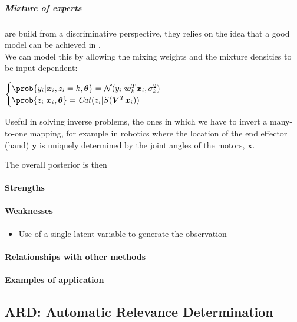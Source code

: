 \subparagraph{Mixture of experts}
are build from a discriminative perspective, they relies on the idea that a good
model can be achieved in .\\
We can model this by allowing the mixing weights and the mixture densities to be
input-dependent: 
\begin{center}
    $\begin{cases}
        \prob{y_{i}|\bm{x}_{i},z_{i}=k,\bm{\theta}} = \mathcal{N}(y_{i}|\bm{w}_{k}^{T}
        \bm{x}_{i},\sigma_{k}^{2}) \\
        \prob{z_{i}|\bm{x}_{i},\bm{\theta}} = \text{\emph{Cat}}(z_{i}|S(\bm{V}^{T}
        \bm{x}_{i}))
    \end{cases}$
\end{center}
Useful in solving inverse problems, the ones in which we have to invert a many-to-one
mapping, for example in robotics where the location of the end effector (hand) $\bm{y}$
is uniquely determined by the joint angles of the motors, $\bm{x}$.

The overall posterior is then
\begin{center}
\end{center}




\paragraph{Strengths}

\paragraph{Weaknesses}
\begin{itemize}
    \item Use of a single latent variable to generate the observation
\end{itemize}

\paragraph{Relationships with other methods}
\paragraph{Examples of application}


\subsection{ARD: Automatic Relevance Determination}

